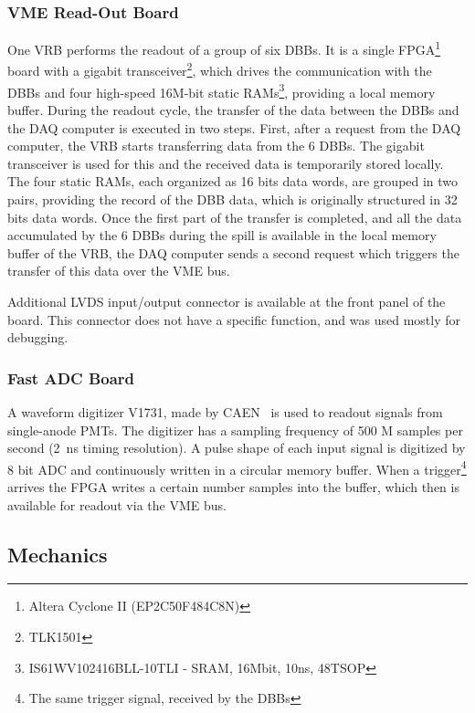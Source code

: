 \documentclass[a4paper,11pt]{article}
\begin{document}
\subsubsection{VME Read-Out Board}\label{electronics:subsec:vme_readout_board}

One VRB performs the readout of a group of six DBBs. It is a single FPGA\footnote{Altera Cyclone II (EP2C50F484C8N)} board with a gigabit 
transceiver\footnote{TLK1501}, which drives the communication with the DBBs and four high-speed 16M-bit static RAMs\footnote{IS61WV102416BLL-10TLI
- SRAM, 16Mbit, 10ns, 48TSOP}, providing a local memory buffer. During the readout cycle, the transfer of the data between the DBBs and the DAQ computer
is executed in two steps. First, after a request from the DAQ computer, the VRB starts transferring data from the 6 DBBs. The gigabit transceiver is used
for this and the received data is temporarily stored locally. The four static RAMs, each organized as 16 bits data words, are grouped in two pairs,
providing the record of the DBB data, which is originally structured in 32 bits data words. Once the first part of the transfer is completed, and all
the data accumulated by the 6 DBBs during the spill is available in the local memory buffer of the VRB, the DAQ computer sends a second request which
triggers the transfer of this data over the VME bus.

Additional LVDS input/output connector is available at the front panel of the board. This connector does not have a specific function, and was used
mostly for debugging.

\subsubsection{Fast ADC Board}\label{electronics:subsec:fast_adc_board}

A waveform digitizer V1731, made by CAEN~\cite{V1731} is used to readout signals from single-anode PMTs. The digitizer has a sampling frequency of 500 M
samples per second (2~ns timing resolution). A pulse shape of each input signal is digitized by 8 bit ADC and continuously written in a circular memory
buffer. When a trigger\footnote{The same trigger signal, received by the DBBs} arrives the FPGA writes a certain number samples into the buffer, which
then is available for readout via the VME bus.

\subsection{Mechanics}\label{design:subsec:mechanics}
\end{document}
